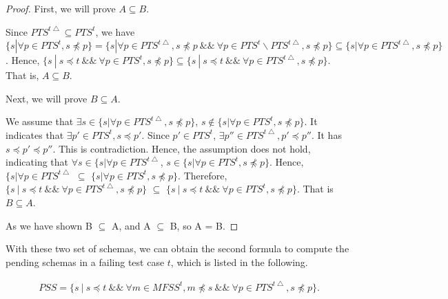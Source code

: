 \begin{proof}

First, we will prove $A \subseteq B$.

Since $PTS^{t\bigtriangleup} \subseteq PTS^{t}$, we have $  \{ s | \forall p \in PTS^{t}, s \npreceq p \} =  \{ s | \forall p \in PTS^{t\bigtriangleup}, s \npreceq p \ \&\& \  \forall p \in PTS^{t} \backslash PTS^{t\bigtriangleup}, s \npreceq p \} \subseteq \{ s | \forall p \in PTS^{t\bigtriangleup}, s \npreceq p \}$. Hence,  $\{ s\ |\ s \preceq t\ \&\&\ \forall p \in PTS^{t}, s \npreceq p \} \subseteq  \{ s\ |\ s \preceq t\ \&\&\ \forall p \in PTS^{t\bigtriangleup}, s \npreceq p \}$. That is,  $A \subseteq B$.

Next, we will prove $B \subseteq A$.

We assume that  $\exists s \in  \{ s | \forall p \in PTS^{t\bigtriangleup}, s \npreceq p \}$, $ s \notin \{ s | \forall p \in PTS^{t}, s \npreceq p \}$. It indicates that $\exists p' \in PTS^{t}, s \preceq p'$. Since $p' \in PTS^{t}$, $\exists p'' \in PTS^{t\bigtriangleup}, p' \preceq p''$. It has $s \preceq p' \preceq p''$. This is contradiction.  Hence, the assumption does not hold, indicating that $\forall s \in  \{ s | \forall p \in PTS^{t\bigtriangleup}$, $s \in  \{ s | \forall p \in PTS^{t}, s \npreceq p \}$. Hence, $\{ s | \forall p \in PTS^{t\bigtriangleup}$ $\subseteq$ $\{ s | \forall p \in PTS^{t}, s \npreceq p \}$. Therefore, $\{ s\ |\ s \preceq t\ \&\&\ \forall p \in PTS^{t\bigtriangleup}, s \npreceq p \}$ $\subseteq$ $\{ s\ |\ s \preceq t\ \&\&\ \forall p \in PTS^{t}, s \npreceq p \} $. That is $B \subseteq A$.

As we have shown B $\subseteq$ A, and A $\subseteq$ B, so A = B.
\end{proof}



With these two set of schemas, we can obtain the second formula to compute the pending schemas in a failing test case $t$, which is listed in the following.

\begin{equation}
\begin{aligned}\label{eq:pssfirst_mutated}
PSS=\{ s\ |\ s \preceq t\ \&\&\ \forall m \in MFSS^{t},  m \npreceq s  \ \&\&\  \forall p \in PTS^{t\bigtriangleup}, s \npreceq p \} .
\end{aligned}
\end{equation}

